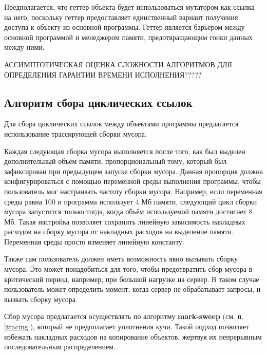 Предполагается, что геттер объекта будет использоваться мутатором как ссылка на него, поскольку геттер предоставляет единственный вариант получения доступа к объекту из основной программы. Геттер является барьером между основной программой и менеджером памяти, предотвращающим гонки данных между ними.

АССИМПТОТИЧЕСКАЯ ОЦЕНКА СЛОЖНОСТИ АЛГОРИТМОВ ДЛЯ ОПРЕДЕЛЕНИЯ ГАРАНТИИ ВРЕМЕНИ ИСПОЛНЕНИЯ?????



\subsection{Алгоритм сбора циклических ссылок}

Для сбора циклических ссылок между объектами программы предлагается использование трассирующей сборки мусора.

Каждая следующая сборка мусора выполняется после того, как был выделен дополнительный объём памяти, пропорциональный тому, который был зафиксирован при предыдущем запуске сборки мусора. Данная пропорция должна конфигурироваться с помощью переменной среды выполнения программы, чтобы пользователь мог настраивать частоту сборки мусора. Например, если переменная среды равна 100 и программа использует 4 Мб памяти, следующий цикл сборки мусора запустится только тогда, когда объём используемой памяти достигнет 8 Мб. Такая настройка позволяет сохранить линейную зависимость накладных расходов на сборку мусора от накладных расходов на выделение памяти. Переменная среды просто изменяет линейную константу.

Также сам пользователь должен иметь возможность явно вызывать сборку мусора. Это может понадобиться для того, чтобы предотвратить сбор мусора в критический период, например, при большой нагрузке на сервер. В таком случае пользователь может определить момент, когда сервер не обрабатывает запросы, и вызвать сборку мусора.

Сбор мусора предлагается осуществлять по алгоритму \textbf{mark-sweep} (см. п. \ref{tracing}), который не предполагает уплотнения кучи. Такой подход позволяет избежать накладных расходов на копирование объектов, жертвуя их непрерывным последовательным распределением.

